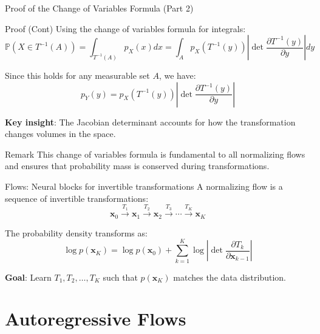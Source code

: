 \documentclass[aspectratio=169]{beamer}
\begin{document}
\begin{frame}{Proof of the Change of Variables Formula (Part 2)}
\small
\begin{block}{Proof (Cont)}
Using the change of variables formula for integrals:
\begin{equation}
    \mathbb{P}(X \in T^{-1}(A)) = \int_{T^{-1}(A)} p_X(x) dx = \int_A p_X(T^{-1}(y)) \left|\det \frac{\partial T^{-1}(y)}{\partial y}\right| dy
\end{equation}

Since this holds for any measurable set $A$, we have:
\begin{equation}
    p_Y(y) = p_X(T^{-1}(y)) \left|\det \frac{\partial T^{-1}(y)}{\partial y}\right|
\end{equation}

\textbf{Key insight}: The Jacobian determinant accounts for how the transformation changes volumes in the space.
\end{block}

\begin{alertblock}{Remark}
    This change of variables formula is fundamental to all normalizing flows and ensures that probability mass is conserved during transformations.
\end{alertblock}
\end{frame}

\begin{frame}{Flows: Neural blocks for invertible transformations}
A normalizing flow is a sequence of invertible transformations:
\begin{equation}
    \mathbf{x}_0 \xrightarrow{T_1} \mathbf{x}_1 \xrightarrow{T_2} \mathbf{x}_2 \xrightarrow{T_3} \cdots \xrightarrow{T_K} \mathbf{x}_K
\end{equation}

The probability density transforms as:
\begin{equation}
    \log p(\mathbf{x}_K) = \log p(\mathbf{x}_0) + \sum_{k=1}^K \log \left|\det \frac{\partial T_k}{\partial \mathbf{x}_{k-1}}\right|
\end{equation}

\textbf{Goal}: Learn $T_1, T_2, \ldots, T_K$ such that $p(\mathbf{x}_K)$ matches the data distribution.
\end{frame}

\section{Autoregressive Flows}
\end{document}
